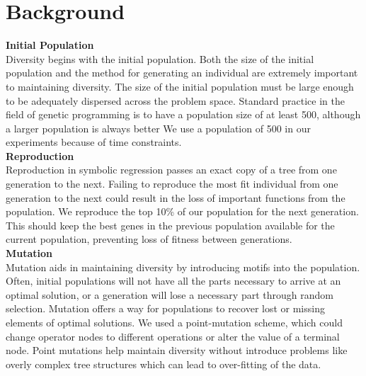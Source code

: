 
\section{Background}
\label{sec:background}

\textbf{Initial Population}\\
	Diversity begins with the initial population. Both the size of the initial population and the method for generating an individual are extremely important to maintaining diversity. The size of the initial population must be large enough to be adequately dispersed across the problem space. Standard practice in the field of genetic programming is to have a population size of at least 500, although a larger population is always better \cite{poli08:fieldguide}We use a population of 500 in our experiments because of time constraints.\\

\textbf{Reproduction}\\
	Reproduction in symbolic regression passes an exact copy of a tree from one generation to the next. Failing to reproduce the most fit individual from one generation to the next could result in the loss of important functions from the population. We reproduce the top 10\% of our population for the next generation. This should keep the best genes in the previous population available for the current population, preventing loss of fitness between generations.\\

\textbf{Mutation}\\
	Mutation aids in maintaining diversity by introducing motifs into the population. Often, initial populations will not have all the parts necessary to arrive at an optimal solution, or a generation will lose a necessary part through random selection. Mutation offers a way for populations to recover lost or missing elements of optimal solutions. We used a point-mutation scheme, which could change operator nodes to different operations or alter the value of a terminal node. Point mutations help maintain diversity without introduce problems like overly complex tree structures which can lead to over-fitting of the data.\\

